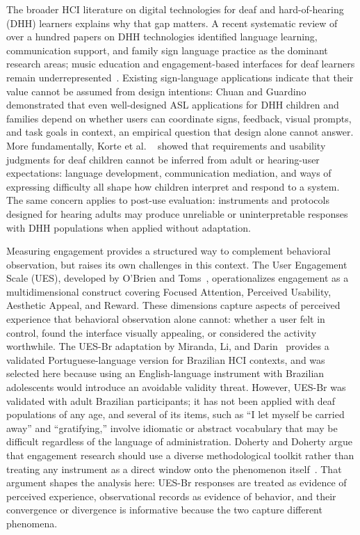 \documentclass{llncs}
\begin{document}
The broader HCI literature on digital technologies for deaf and hard-of-hearing (DHH)
learners explains why that gap matters. A recent systematic review of over a hundred
papers on DHH technologies identified language learning, communication support, and
family sign language practice as the dominant research areas; music education and
engagement-based interfaces for deaf learners remain underrepresented~\cite{zhao2025dhhchildren}.
Existing sign-language applications indicate that their value cannot be assumed from
design intentions: Chuan and Guardino~\cite{chuan2016smartsignplay} demonstrated that
even well-designed ASL applications for DHH children and families depend on whether
users can coordinate signs, feedback, visual prompts, and task goals in context, an empirical question that design alone cannot answer. More fundamentally, Korte et al.
~\cite{korte2014requirements} showed that requirements and usability judgments for deaf
children cannot be inferred from adult or hearing-user expectations: language
development, communication mediation, and ways of expressing difficulty all shape how
children interpret and respond to a system. The same concern applies to post-use evaluation: instruments and protocols designed for hearing adults may produce unreliable
or uninterpretable responses with DHH populations when applied without adaptation.

Measuring engagement provides a structured way to complement behavioral observation, but
raises its own challenges in this context. The User Engagement Scale (UES), developed by
O'Brien and Toms~\cite{obrien2010ues}, operationalizes engagement as a multidimensional
construct covering Focused Attention, Perceived Usability, Aesthetic Appeal, and Reward.
These dimensions capture aspects of perceived experience that behavioral observation
alone cannot: whether a user felt in control, found the interface visually appealing, or
considered the activity worthwhile. The UES-Br adaptation by Miranda, Li, and
Darin~\cite{miranda2021uesbr} provides a validated Portuguese-language version for
Brazilian HCI contexts, and was selected here because using an English-language
instrument with Brazilian adolescents would introduce an avoidable validity threat.
However, UES-Br was validated with adult Brazilian participants; it has not been applied
with deaf populations of any age, and several of its items, such as ``I let myself be carried away'' and ``gratifying,'' involve idiomatic or abstract vocabulary that may be difficult regardless of the language of administration. Doherty and Doherty argue that
engagement research should use a diverse methodological toolkit rather than treating any
instrument as a direct window onto the phenomenon itself~\cite{doherty2018engagement}. That argument shapes the analysis here: UES-Br responses are treated as evidence of perceived experience, observational records as evidence of behavior, and their convergence or divergence is informative because the two capture different phenomena.
\end{document}
